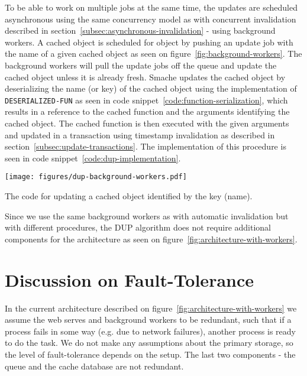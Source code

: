 To be able to work on multiple jobs at the same time, the updates are scheduled asynchronous using the same concurrency model as with concurrent invalidation described in section~\ref{subsec:asynchronous-invalidation} - using background workers. A cached object is scheduled for object by pushing an update job with the name of a given cached object as seen on figure~\ref{fig:background-workers}. The background workers will pull the update jobs off the queue and update the cached object unless it is already fresh. Smache updates the cached object by deserializing the name (or key) of the cached object using the implementation of \verb$DESERIALIZED-FUN$ as seen in code snippet~\ref{code:function-serialization}, which results in a reference to the cached function and the arguments identifying the cached object. The cached function is then executed with the given arguments and updated in a transaction using timestamp invalidation as described in section~\ref{subsec:update-transactions}. The implementation of this procedure is seen in code snippet~\ref{code:dup-implementation}.

\begin{figure*}[ht!]
  \centering
  \texttt{[image: figures/dup-background-workers.pdf]}
  \caption{How Smache schedules cached objects to be updated using background workers}
  \label{fig:dup-background-workers}
\end{figure*}

\begin{code}{The code for updating a cached object identified by the key (name).}
  \centering
  
  \label{code:dup-implementation}
\end{code}

Since we use the same background workers as with automatic invalidation but with different procedures, the DUP algorithm does not require additional components for the architecture as seen on figure~\ref{fig:architecture-with-workers}.


\section{Discussion on Fault-Tolerance}
\label{sec:discussion-on-fault-tolerance}

In the current architecture described on figure~\ref{fig:architecture-with-workers} we assume the web serves and background workers to be redundant, such that if a process fails in some way (e.g. due to network failures), another process is ready to do the task. We do not make any assumptions about the primary storage, so the level of fault-tolerance depends on the setup. The last two components - the queue and the cache database are not redundant.

